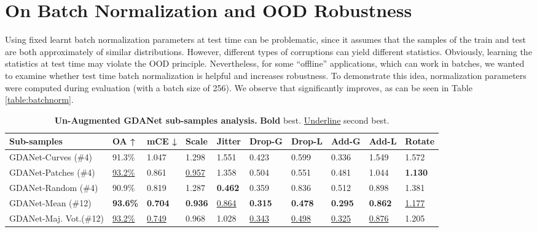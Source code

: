 \documentclass[10pt,twocolumn]{article}
\begin{document}
\section{On Batch Normalization and OOD Robustness}
Using fixed learnt batch normalization parameters at test time can be problematic, since it assumes that the samples of the train and test are both approximately of similar  distributions. However, different types of corruptions can yield different statistics.
Obviously, learning the statistics at test time may violate the OOD principle. Nevertheless, for some ``offline'' applications, which can work in batches, we wanted to examine whether test time batch normalization is helpful  
and increases robustness. To demonstrate this idea, normalization parameters were computed during evaluation (with a batch size of 256). We observe that  significantly improves, as can be seen in Table \ref{table:batchnorm}.









\begin{table*}
  \centering
    \begin{tabular}{p{4cm} || p{1.1cm} p{1.1cm} p{1.1cm} p{1.1cm} p{1.2cm} p{1.2cm} p{1.1cm} p{1.1cm} p{1.1cm}}
    \hline
    Sub-samples & OA ↑ & mCE ↓ & Scale & Jitter & Drop-G & Drop-L & Add-G & Add-L & Rotate \\
    \hline
    GDANet-Curves (\#4) & 91.3\% & 1.047 & 1.298 & 1.551 & 0.423 & 0.599 & 0.336 & 1.549 & 1.572\\
    GDANet-Patches (\#4) & \underline{93.2\%} & 0.861 & \underline{0.957} & 1.358 & 0.504 & 0.551 & 0.481 & 1.044 & \textbf{1.130}\\
    GDANet-Random (\#4) & 90.9\% & 0.819 & 1.287 & \textbf{0.462} & 0.359 & 0.836 & 0.512 & 0.898 & 1.381\\
    \hline
    GDANet-Mean (\#12) & \textbf{93.6\%} & \textbf{0.704} & \textbf{0.936} & \underline{0.864} & \textbf{0.315} &  \textbf{0.478} & \textbf{0.295} & \textbf{0.862} &  \underline{1.177}\\
    GDANet-Maj. Vot.(\#12) & \underline{93.2\%} & \underline{0.749} & 0.968 & 1.028 & \underline{0.343} &  \underline{0.498} & \underline{0.325} & \underline{0.876} &  1.205\\
    
    \hline
  \end{tabular}
  \caption{{\bf Un-Augmented GDANet sub-samples analysis.} {\bf Bold} best. \underline{Underline} second best.}
  \label{table:gdanet_unaugmented_sub_samples}
\end{table*}
\end{document}
